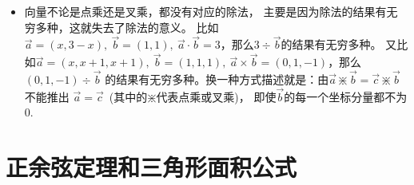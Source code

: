 \begin{itemize}[leftmargin=\inteval{\myitemleftmargin}pt,itemsep=
   \inteval{\myitemitempsep}pt,topsep=\inteval{\myitemtopsep}pt]
\item 向量不论是点乘还是叉乘，都没有对应的除法，
主要是因为除法的结果有无穷多种，这就失去了除法的意义。
比如$ \vec{a}=(x,3-x),\ \vec{b}=(1,1),\ 
\vec{a}\cdot \vec{b}=3 $，那么$ 3\div \vec{b} $的结果有无穷多种。
又比如$ \vec{a}=(x,x+1,x+1),\ \vec{b}=(1,1,1),\ 
\vec{a}\times\vec{b}=(0,1,-1) $，那么$ (0,1,-1) \div \vec{b} $
的结果有无穷多种。换一种方式描述就是：由$ \vec{a}\divideontimes 
\vec{b}=\vec{c}\divideontimes \vec{b} $不能推出
$ \vec{a}=\vec{c} $\ (其中的$ \divideontimes $代表点乘或叉乘)，
即使$ \vec{b} $的每一个坐标分量都不为0.

\end{itemize}

\section{正余弦定理和三角形面积公式}
